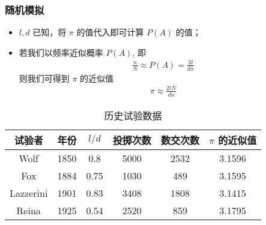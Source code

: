 	\begin{frame}
		\frametitle{随机模拟}
		\vspace{-0.2cm}
		\begin{itemize}
			\item $l,d$ 已知，将 $\pi$ 的值代入即可计算 $P (A)$ 的值；
			\item 若我们以频率近似概率 $P (A)$, 即
			\begin{eqnarray*}
				\frac{n}{N}\approx P(A)=\frac{2l}{d\pi}
			\end{eqnarray*}
			则我们可得到 $\pi$ 的近似值
			\begin{eqnarray*}
				\pi\approx \frac{2lN}{dn}
			\end{eqnarray*}
		\end{itemize}
		\vspace{-0.5cm}
		\pause
		\begin{table}
			\centering
			\caption{历史试验数据}
			\begin{tabular}{|c|c|c|c|c|c|}
				\hline
				\rowcolor{blue!50}
				试验者 & 年份  &$l/d$ & 投掷次数 & 数交次数 &$\pi$ 的近似值 \\
				\hline
				Wolf & 1850 & 0.8  & 5000 &  2532 &3.1596\\
				Fox  & 1884 & 0.75  &1030 &  489  &3.1595\\
				Lazzerini & 1901 & 0.83  &3408 &  1808 &3.1415\\
				Reina & 1925 & 0.54  & 2520 &  859 &3.1795\\
				\hline
			\end{tabular}
		\end{table}
	\end{frame}
